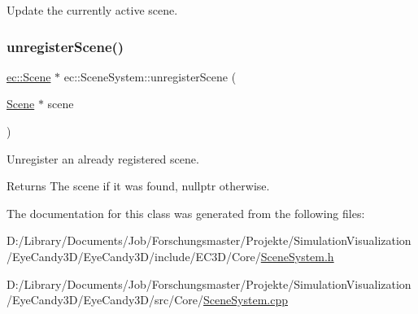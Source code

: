 Update the currently active scene. 

\mbox{\label{classec_1_1_scene_system_ae00450951bc3220dd9899d75bdd207c4}} 
\subsubsection{\texorpdfstring{unregister\+Scene()}{unregisterScene()}}
{\footnotesize\ttfamily \mbox{\hyperlink{classec_1_1_scene}{ec\+::\+Scene}} $\ast$ ec\+::\+Scene\+System\+::unregister\+Scene (\begin{DoxyParamCaption}\item[{\mbox{\hyperlink{classec_1_1_scene}{Scene}} $\ast$}]{scene }\end{DoxyParamCaption})}



Unregister an already registered scene. 

\begin{DoxyReturn}{Returns}
The scene if it was found, nullptr otherwise. 
\end{DoxyReturn}


The documentation for this class was generated from the following files\+:\begin{DoxyCompactItemize}
\item 
D\+:/\+Library/\+Documents/\+Job/\+Forschungsmaster/\+Projekte/\+Simulation\+Visualization/\+Eye\+Candy3\+D/\+Eye\+Candy3\+D/include/\+E\+C3\+D/\+Core/\mbox{\hyperlink{_scene_system_8h}{Scene\+System.\+h}}\item 
D\+:/\+Library/\+Documents/\+Job/\+Forschungsmaster/\+Projekte/\+Simulation\+Visualization/\+Eye\+Candy3\+D/\+Eye\+Candy3\+D/src/\+Core/\mbox{\hyperlink{_scene_system_8cpp}{Scene\+System.\+cpp}}\end{DoxyCompactItemize}
